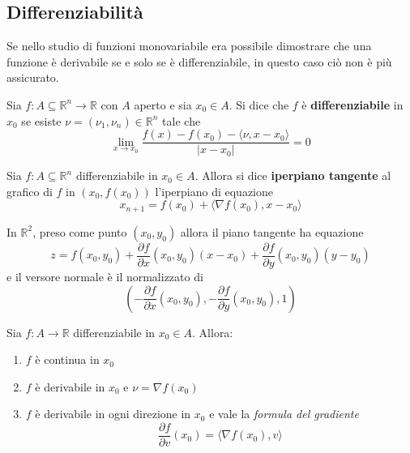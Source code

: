 \subsection{Differenziabilità}
Se nello studio di funzioni monovariabile era possibile dimostrare che una funzione è derivabile se e solo se è differenziabile, in questo caso ciò non è più assicurato.
\begin{definition} \label{Def: Differenziabilità}
    Sia $f:A \subseteq \mathbb{R}^n \to \mathbb{R}$ con $A$ aperto e sia $x_0 \in A$. Si dice che $f$ è \textbf{differenziabile} in $x_0$ se esiste $\nu=(\nu_1, \nu_n) \in \mathbb{R}^n$ tale che
    \begin{equation*}
        \lim_{x \to x_0}{\frac{f(x)-f(x_0)-\langle \nu, x-x_0\rangle}{|x-x_0|}}=0
    \end{equation*}
\end{definition}
\begin{definition} {\label{Def: Piano tangente}}
    Sia $f:A \subseteq \mathbb{R}^n$ differenziabile in $x_0 \in A$. Allora si dice \textbf{iperpiano tangente} al grafico di $f$ in $(x_0, f(x_0))$ l'iperpiano di equazione
    \begin{equation*}
        x_{n+1}= f(x_0)+ \langle \nabla f(x_0), x-x_0 \rangle
    \end{equation*}
\end{definition}
 \begin{oss}
    In $\mathbb{R}^2$, preso come punto $(x_0, y_0)$ allora il piano tangente ha equazione
    \begin{equation*}
        z=f(x_0, y_0)+ \frac{\partial f }{\partial x}{(x_0, y_0)}(x-x_0) +\frac{\partial f }{\partial y}{(x_0, y_0)}(y-y_0) 
    \end{equation*}
    e il versore normale è il normalizzato di
    \begin{equation*}
        \left(-\frac{\partial f}{\partial x}{(x_0, y_0)}, -\frac{\partial f}{\partial y}{(x_0, y_0)},1\right)
    \end{equation*}
 \end{oss}
\begin{proposition} \label{Prop: Diff-Der-Cont}
    Sia $f:A \to \mathbb{R}$ differenziabile in $x_0 \in A$. Allora:
    \begin{enumerate}
        \item $f$ è continua in $x_0$
        \item $f$ è derivabile in $x_0$ e $\nu=\nabla f(x_0)$
        \item $f$ è derivabile in ogni direzione in $x_0$ e vale la \textit{formula del gradiente}
            \begin{equation} \label{Eq:Formula gradiente}
                \frac{\partial{f}}{\partial{v}}(x_0)= \langle \nabla f(x_0), v\rangle
            \end{equation}
    \end{enumerate}
\end{proposition}
